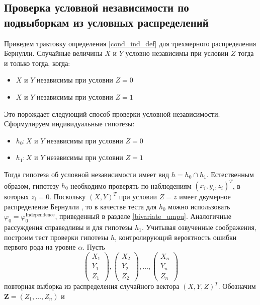 \begin{centering}
    \subsection{Проверка условной независимости по подвыборкам из условных распределений}
\end{centering}

Приведем трактовку определения \ref{cond_ind_def} для трехмерного
распределения Бернулли. Случайные величины $X$ и $Y$
условно независимы при условии $Z$ тогда и только тогда,
когда:
\begin{itemize}
    \item $X$ и $Y$ независимы при условии $Z=0$
    \item $X$ и $Y$  независимы при условии $Z=1$
\end{itemize}
Это порождает следующий способ проверки условной независимости. 
Сформулируем индивидуальные гипотезы:
\begin{itemize}
    \item $h_0 : X$ и $Y$ независимы при условии $Z=0$
    \item $h_1 : X$ и $Y$ независимы при условии $Z=1$
\end{itemize}
Тогда гипотеза об условной независимости имеет вид 
$h = h_0 \cap h_1$. Естественным образом, гипотезу 
$h_0$ необходимо проверять по наблюдениям
$(x_i,y_i,z_i)^T$, в которых $z_i=0$. Поскольку $(X,Y)^T$ при условии
$Z=z$ имеет двумерное распределение Бернулли \cite{Dai2013}, то
в качестве теста для $h_0$ можно использовать
$\varphi_0 = \varphi^{\text{Independence}}_0$, 
приведенный в разделе \ref{bivariate_umpu}. Аналогичные рассуждения 
справедливы и для гипотезы $h_1$. Учитывая озвученные соображения,
построим тест проверки гипотезы $h$, контролирующий вероятность
ошибки первого рода на уровне $\alpha$.
Пусть
$$
\begin{pmatrix}
        X_1 \\
        Y_1 \\
        Z_1
    \end{pmatrix},
    \begin{pmatrix}
        X_2 \\
        Y_2 \\
        Z_2
    \end{pmatrix}, \ldots,
    \begin{pmatrix}
        X_n \\
        Y_n \\
        Z_n
    \end{pmatrix}
$$ повторная выборка из распределения случайного вектора $(X,Y,Z)^T$. Обозначим $\mathbf{Z}=(Z_1,\ldots,Z_n)$ и 
